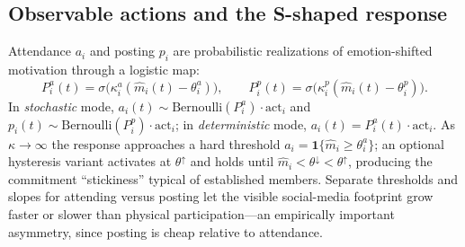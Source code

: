\documentclass[11pt]{article}
\begin{document}
\subsection{Observable actions and the S-shaped response}\label{sec:actions}
Attendance $a_i$ and posting $p_i$ are probabilistic realizations of emotion-shifted motivation through a logistic map:
\begin{equation}\tag{A}\label{eq:actions}
P^a_i(t)=\sigma\!\big(\kappa^a_i(\hat m_i(t)-\theta^a_i)\big),\qquad
P^p_i(t)=\sigma\!\big(\kappa^p_i(\hat m_i(t)-\theta^p_i)\big).
\end{equation}
In \emph{stochastic} mode, $a_i(t)\sim\mathrm{Bernoulli}(P^a_i)\cdot\mathrm{act}_i$ and $p_i(t)\sim\mathrm{Bernoulli}(P^p_i)\cdot\mathrm{act}_i$; in \emph{deterministic} mode, $a_i(t)=P^a_i(t)\cdot\mathrm{act}_i$. As $\kappa\to\infty$ the response approaches a hard threshold $a_i=\mathbf 1\{\hat m_i\ge\theta^a_i\}$; an optional hysteresis variant activates at $\theta^{\uparrow}$ and holds until $\hat m_i<\theta^{\downarrow}<\theta^{\uparrow}$, producing the commitment ``stickiness'' typical of established members. Separate thresholds and slopes for attending versus posting let the visible social-media footprint grow faster or slower than physical participation---an empirically important asymmetry, since posting is cheap relative to attendance.
\end{document}
